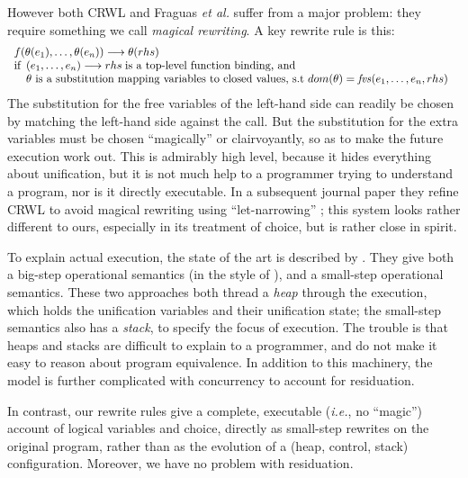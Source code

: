 \documentclass[acmsmall,review,anonymous,dvipsnames]{acmart}
\newcommand{\ie}{\emph{i.e.}}	%
\newcommand{\etal}{\emph{et al.}}
\begin{document}
However both CRWL and Fraguas {\etal} suffer from a major problem:
they require something we call \emph{magical rewriting}. A key rewrite rule is this:
$$
\begin{array}{l}
f( \theta(e_1),\ldots, \theta(e_n) ) \longrightarrow \theta( rhs ) \\
\text{if}
\begin{array}[t]{l}
  (e_1, \ldots, e_n) \longrightarrow rhs
   \; \text{is a top-level function binding, and} \\
\text{$\theta$ is a substitution mapping variables to closed values, s.t
$dom(\theta) = \mathit{fvs}(e_1, \ldots, e_n, rhs)$}
\end{array}
\end{array}
$$
The substitution for the free variables of the left-hand side can
readily be chosen by matching the left-hand side against the call.
But the substitution for the extra variables must be chosen ``magically''
\cite[Section 7]{fraguas:rewriting} or clairvoyantly, so as to make the future execution
work out. This is admirably high level, because it hides everything
about unification, but it is not much help to a programmer trying to
understand a program, nor is it directly executable.
In a subsequent journal paper they refine CRWL to avoid magical rewriting using
``let-narrowing'' \cite[Section 6]{fraguas:let-narrowing}; this system
looks rather different to ours, especially in its treatment of choice,
but is rather close in spirit.

To explain actual execution, the state of the art is described by
\citet{hanus:semantics}.  They give both a big-step operational
semantics (in the style of \citep{launchbury:natural}), and
a small-step operational semantics.  These two approaches both thread a
\emph{heap} through the execution, which holds the unification variables and their unification
state; the small-step semantics also has a \emph{stack}, to specify
the focus of execution.
%
The trouble is that heaps and stacks are difficult to explain to a programmer,
and do not make it easy to reason about program equivalence.
%
In addition to this machinery, the model is further complicated with
concurrency to account for residuation.

In contrast, our rewrite rules give a complete, executable ({\ie}, no ``magic'')
account of logical variables and choice, directly as small-step
rewrites on the original program, rather than as the evolution of a
(heap, control, stack) configuration. Moreover, we have no problem with
residuation.
\end{document}
